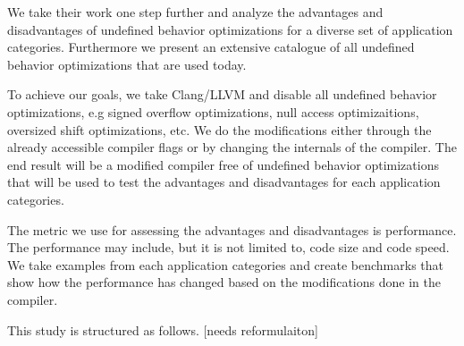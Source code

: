 We take their work one step further and analyze the advantages and
disadvantages of undefined behavior optimizations for a diverse set of
application categories. Furthermore we present an extensive catalogue of
all undefined behavior optimizations that are used today.

To achieve our goals, we take Clang/LLVM and disable all undefined
behavior optimizations, e.g signed overflow optimizations, null access
optimizaitions, oversized shift optimizations, etc. We do the
modifications either through the already accessible compiler flags or by
changing the internals of the compiler. The end result will be a
modified compiler free of undefined behavior optimizations that will be
used to test the advantages and disadvantages for each application
categories.

The metric we use for assessing the advantages and disadvantages is
performance. The performance may include, but it is not limited to, code
size and code speed. We take examples from each application categories
and create benchmarks that show how the performance has changed based on
the modifications done in the compiler.

This study is structured as follows. [needs reformulaiton]
